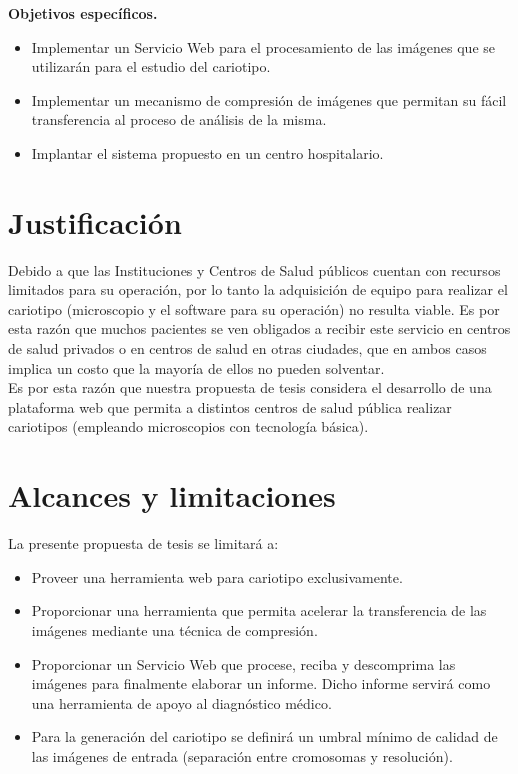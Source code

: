 \documentclass[12pt,letterpaper,titlepage]{article}
\begin{document}
\begin{itemize}
\textbf{Objetivos específicos.}\\

\begin{itemize}\itemsep=0pt
\item Implementar un Servicio Web para el procesamiento de las imágenes que se utilizarán para el estudio del cariotipo.
\item Implementar un mecanismo de compresión de imágenes que permitan su fácil transferencia al proceso de análisis de la misma.
\item Implantar el sistema propuesto en un centro hospitalario.
\end{itemize}


\section{Justificación}\label{Justi}

Debido a que las Instituciones y Centros de Salud públicos cuentan con recursos limitados para su operación, por lo tanto la adquisición de equipo para realizar el cariotipo (microscopio y el software para su operación) no resulta viable. Es por esta razón que muchos pacientes se ven obligados a recibir este servicio en centros de salud privados o en centros de salud en otras ciudades, que en ambos casos implica un costo que la mayoría de ellos no pueden solventar.\\

Es por esta razón que nuestra propuesta de tesis considera el desarrollo de una plataforma web que permita a distintos centros de salud pública realizar cariotipos (empleando microscopios con tecnología básica).\\



\section{Alcances y limitaciones}\label{limitaciones}

La presente propuesta de tesis se limitará a:

\begin{itemize}\itemsep=0pt
\item Proveer una herramienta web para cariotipo exclusivamente.
\item Proporcionar una herramienta que permita acelerar la transferencia de las imágenes mediante una técnica de compresión.
\item Proporcionar un Servicio Web que procese, reciba y descomprima las imágenes para finalmente elaborar un informe. Dicho informe servirá como una herramienta de apoyo al diagnóstico médico.
\item Para la generación del cariotipo se definirá un umbral mínimo de calidad de las imágenes de entrada (separación entre cromosomas y resolución).
\end{itemize}



\end{itemize}
\end{document}
